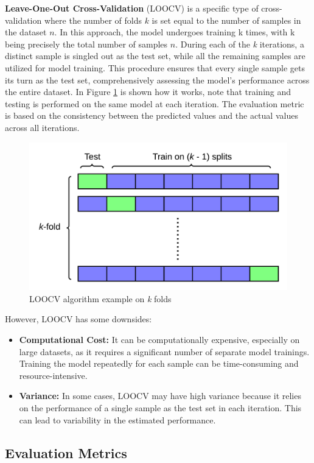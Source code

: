 \textbf{Leave-One-Out Cross-Validation} (LOOCV) is a specific type of cross-validation where the number of folds $k$ is set equal to the number of samples in the dataset $n$. 
In this approach, the model undergoes training k times, with k being precisely the total number of samples $n$.
During each of the \textit{k} iterations, a distinct sample is singled out as the test set, while all the remaining samples are utilized for model training. 
This procedure ensures that every single sample gets its turn as the test set, comprehensively assessing the model's performance across the entire dataset.
In Figure \ref{fig:LOOCV} is shown how it works, note that training and testing is performed on the same model at each iteration.
The evaluation metric is based on the consistency between the predicted values and the actual values across all iterations.

\begin{figure}[H]
  \centering  
    \includegraphics[width=0.6\linewidth]{graphics/LOOCV.png}
    \caption{LOOCV algorithm example on \textit{k} folds}
    \label{fig:LOOCV}
\end{figure}

However, LOOCV has some downsides:
\begin{itemize}
  \item \textbf{Computational Cost:} It can be computationally expensive, especially on large datasets, as it requires a significant number of separate model trainings. 
  Training the model repeatedly for each sample can be time-consuming and resource-intensive.
  \item \textbf{Variance:} In some cases, LOOCV may have high variance because it relies on the performance of a single sample as the test set in each iteration. 
  This can lead to variability in the estimated performance.
\end{itemize}  
    
\subsection{Evaluation Metrics}
\label{subsec:evaluation_metrics}

